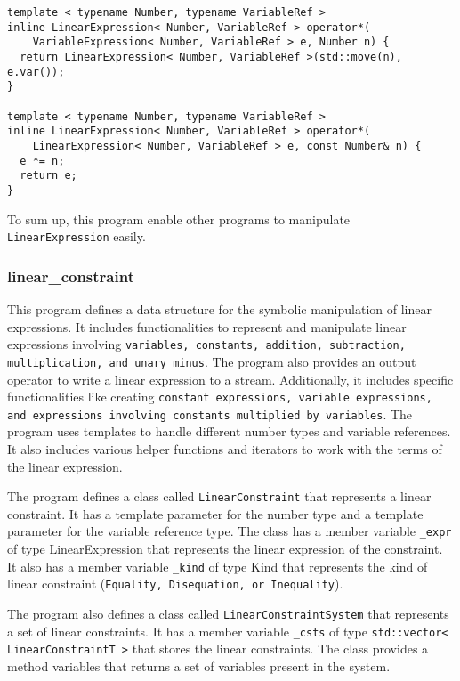 \documentclass[12pt]{article}
\begin{document}
\begin{lstlisting}
template < typename Number, typename VariableRef >
inline LinearExpression< Number, VariableRef > operator*(
    VariableExpression< Number, VariableRef > e, Number n) {
  return LinearExpression< Number, VariableRef >(std::move(n), e.var());
}

template < typename Number, typename VariableRef >
inline LinearExpression< Number, VariableRef > operator*(
    LinearExpression< Number, VariableRef > e, const Number& n) {
  e *= n;
  return e;
}
\end{lstlisting}

To sum up, this program enable other programs to manipulate \texttt{LinearExpression} easily.

\subsubsection{linear\_constraint}
This program defines a data structure for the symbolic manipulation of linear expressions. It includes functionalities to represent and manipulate linear expressions involving \texttt{variables, constants, addition, subtraction, multiplication, and unary minus}. The program also provides an output operator to write a linear expression to a stream. Additionally, it includes specific functionalities like creating \texttt{constant expressions, variable expressions, and expressions involving constants multiplied by variables}. The program uses templates to handle different number types and variable references. It also includes various helper functions and iterators to work with the terms of the linear expression.

The program defines a class called \texttt{LinearConstraint} that represents a linear constraint. It has a template parameter for the number type and a template parameter for the variable reference type. The class has a member variable \texttt{\_expr} of type LinearExpression that represents the linear expression of the constraint. It also has a member variable \texttt{\_kind} of type Kind that represents the kind of linear constraint (\texttt{Equality, Disequation, or Inequality}).

The program also defines a class called \texttt{LinearConstraintSystem} that represents a set of linear constraints. It has a member variable \texttt{\_csts} of type \texttt{std::vector< LinearConstraintT >} that stores the linear constraints. The class provides a method variables that returns a set of variables present in the system.
\end{document}

